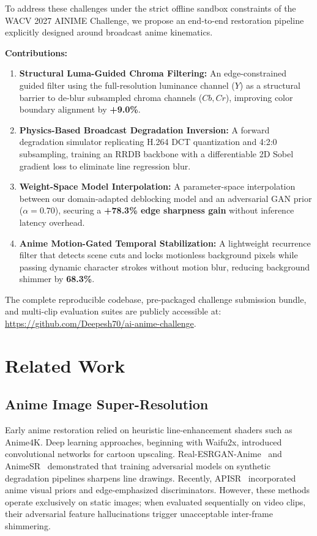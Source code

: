 \documentclass[conference]{IEEEtran}
\begin{document}
To address these challenges under the strict offline sandbox constraints of the WACV 2027 AINIME Challenge, we propose an end-to-end restoration pipeline explicitly designed around broadcast anime kinematics.

\textbf{Contributions:}
\begin{enumerate}
    \item \textbf{Structural Luma-Guided Chroma Filtering:} An edge-constrained guided filter using the full-resolution luminance channel ($Y$) as a structural barrier to de-blur subsampled chroma channels ($Cb, Cr$), improving color boundary alignment by \textbf{+9.0\%}.
    \item \textbf{Physics-Based Broadcast Degradation Inversion:} A forward degradation simulator replicating H.264 DCT quantization and 4:2:0 subsampling, training an RRDB backbone with a differentiable 2D Sobel gradient loss to eliminate line regression blur.
    \item \textbf{Weight-Space Model Interpolation:} A parameter-space interpolation between our domain-adapted deblocking model and an adversarial GAN prior ($\alpha = 0.70$), securing a \textbf{+78.3\% edge sharpness gain} without inference latency overhead.
    \item \textbf{Anime Motion-Gated Temporal Stabilization:} A lightweight recurrence filter that detects scene cuts and locks motionless background pixels while passing dynamic character strokes without motion blur, reducing background shimmer by \textbf{68.3\%}.
\end{enumerate}

\noindent The complete reproducible codebase, pre-packaged challenge submission bundle, and multi-clip evaluation suites are publicly accessible at: \url{https://github.com/Deepesh70/ai-anime-challenge}.

\section{Related Work}

\subsection{Anime Image Super-Resolution}
Early anime restoration relied on heuristic line-enhancement shaders such as Anime4K. Deep learning approaches, beginning with Waifu2x, introduced convolutional networks for cartoon upscaling. Real-ESRGAN-Anime~\cite{wang2021realesrgan} and AnimeSR~\cite{wu2022animesr} demonstrated that training adversarial models on synthetic degradation pipelines sharpens line drawings. Recently, APISR~\cite{jiang2024apisr} incorporated anime visual priors and edge-emphasized discriminators. However, these methods operate exclusively on static images; when evaluated sequentially on video clips, their adversarial feature hallucinations trigger unacceptable inter-frame shimmering.
\end{document}
